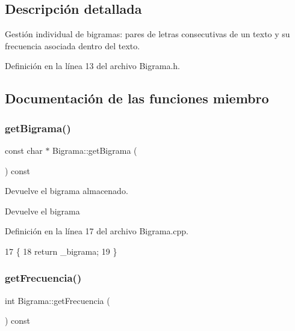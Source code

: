 \subsection{Descripción detallada}
Gestión individual de bigramas\+: pares de letras consecutivas de un texto y su frecuencia asociada dentro del texto. 

Definición en la línea 13 del archivo Bigrama.\+h.



\subsection{Documentación de las funciones miembro}
\mbox{\label{classBigrama_adb616b62beeaa4fb9303cd647ea3fba3}} 
\subsubsection{\texorpdfstring{get\+Bigrama()}{getBigrama()}}
{\footnotesize\ttfamily const char $\ast$ Bigrama\+::get\+Bigrama (\begin{DoxyParamCaption}{ }\end{DoxyParamCaption}) const}



Devuelve el bigrama almacenado. 

\begin{DoxyReturn}{Devuelve}
el bigrama 
\end{DoxyReturn}


Definición en la línea 17 del archivo Bigrama.\+cpp.


\begin{DoxyCode}
17                                       \{
18     \textcolor{keywordflow}{return} \_bigrama;
19 \}
\end{DoxyCode}
\mbox{\label{classBigrama_a5a7f1ec845ac5971c8d788c12171a9c9}} 
\subsubsection{\texorpdfstring{get\+Frecuencia()}{getFrecuencia()}}
{\footnotesize\ttfamily int Bigrama\+::get\+Frecuencia (\begin{DoxyParamCaption}{ }\end{DoxyParamCaption}) const}



